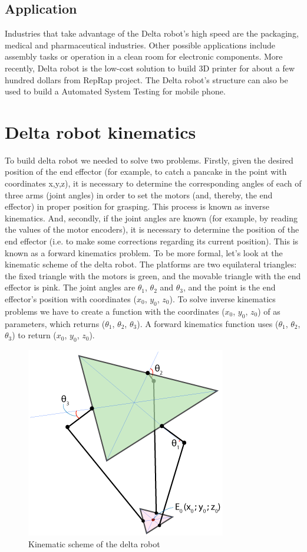 \subsection{Application}
Industries that take advantage of the Delta robot’s high speed are the packaging, medical and pharmaceutical industries. Other possible applications include assembly tasks or operation in a clean room for electronic components. More recently, Delta robot is the low-cost solution to build 3D printer for about a few hundred dollars from RepRap project\cite{reprap_thesis}. The Delta robot’s structure can also be used to build a Automated System Testing for mobile phone.

\section{Delta robot kinematics}
To build delta robot we needed to solve two problems. Firstly, given the desired position of the end effector (for example, to catch a pancake in the point with coordinates x,y,z), it is necessary to determine the corresponding angles of each of three arms (joint angles) in order to set the motors (and, thereby, the end effector) in proper position for grasping. This process is known as inverse kinematics. 
And, secondly, if the joint angles are known (for example, by reading the values of the motor encoders), it is necessary to determine the position of the end effector (i.e. to make some corrections regarding its current position). This is known as a forward kinematics problem. 
To be more formal, let's look at the kinematic scheme of the delta robot. The platforms are two equilateral triangles: the fixed triangle with the motors is green, and the movable triangle with the end effector is pink. The joint angles are $\theta_{1}$, $\theta_{2}$ and $\theta_{3}$, and the point is the end effector’s position with coordinates ($x_{0}$, $y_{0}$, $z_{0}$).
To solve inverse kinematics problems we have to create a function with the coordinates ($x_{0}$, $y_{0}$, $z_{0}$) of as parameters, which returns ($\theta_{1}$, $\theta_{2}$, $\theta_{3}$). A forward kinematics function uses ($\theta_{1}$, $\theta_{2}$, $\theta_{3}$) to return ($x_{0}$, $y_{0}$, $z_{0}$).
\begin{figure}[H]
	\centering
	\includegraphics[width=\maxwidth{15cm}, keepaspectratio]{Chapters/Fig/kinematic_scheme.png}
	\caption{Kinematic scheme of the delta robot}
	\label{fig:kinematic_scheme}
\end{figure}

